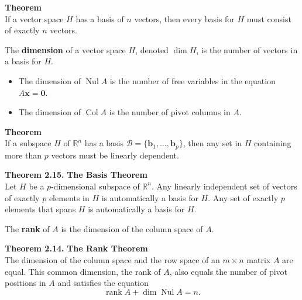 \documentclass[10pt]{book}
\newenvironment{boxthm}{\begin{mdframed}[backgroundcolor=gray!30,nobreak=true]}{\end{mdframed}}
\newenvironment{boxdef}{\begin{mdframed}[backgroundcolor=gray!30,linewidth=0pt,nobreak=true]}{\end{mdframed}}
\newcommand{\B}{\mathscr{B}}
\newcommand{\vect}[1]{\ensuremath{\boldsymbol{\mathbf{#1}}}}
\DeclareMathOperator{\Nul}{Nul}
\DeclareMathOperator{\Col}{Col}
\DeclareMathOperator{\rank}{rank}
\newcommand{\Axz}{A\vect{x}=\vect{0}}
\newcommand{\vectset}[3][v]{\{\vect{#1}_{#2},\ldots,\vect{#1}_{#3}\}}
\begin{document}
\begin{boxthm}
	\textbf{Theorem} \\
	If a vector space $H$ has a basis of $n$ vectors, then every basis for $H$ must consist of exactly $n$ vectors.
\end{boxthm}
\vspace{-1em}
\begin{boxdef}
	The \textbf{dimension} of a vector space $H$, denoted $\dim H$, is the number of vectors in a basis for $H$.
\end{boxdef}

\begin{itemize}
	\item The dimension of $\Nul A$ is the number of free variables in the equation $\Axz$.
	\item The dimension of $\Col A$ is the number of pivot columns in $A$.
\end{itemize}

\begin{boxthm}
	\textbf{Theorem} \\
	If a subspace $H$ of $\mathbb{R}^n$ has a basis $\B=\vectset[b]{1}{p}$, then any set in $H$ containing more than $p$ vectors must be linearly dependent.
\end{boxthm}
\vspace{-1em}
\begin{boxthm}
	\textbf{Theorem 2.15.}
	\textbf{The Basis Theorem} \\
	Let $H$ be a $p$-dimensional subspace of $\mathbb{R}^n$. Any linearly independent set of vectors of exactly $p$ elements in $H$ is automatically a basis for $H$. Any set of exactly $p$ elements that spans $H$ is automatically a basis for $H$.
\end{boxthm}



\begin{boxdef}
	The \textbf{rank} of $A$ is the dimension of the column space of $A$.
\end{boxdef}

\begin{boxthm}
	\textbf{Theorem 2.14.}
	\textbf{The Rank Theorem} \\
	The dimension of the column space and the row space of an $m\times n$ matrix $A$ are equal. This common dimension, the rank of $A$, also equals the number of pivot positions in $A$ and satisfies the equation
	\vspace{-1em}
	$$ \rank A + \dim\Nul A = n. $$
\end{boxthm}
\end{document}
